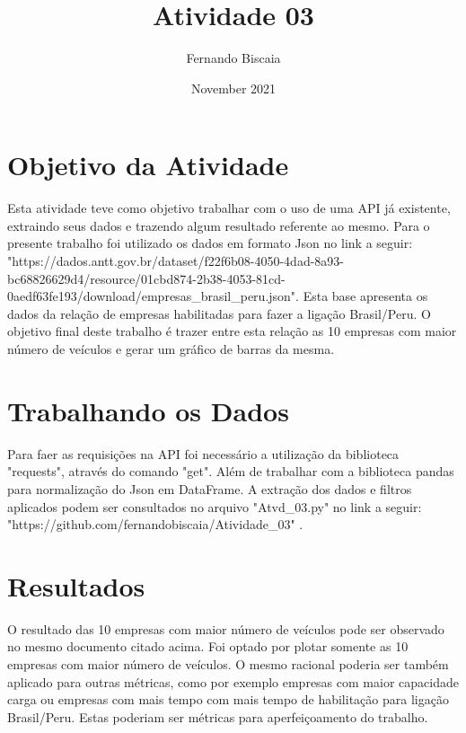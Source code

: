 \documentclass{article}
\title{Atividade 03}
\author{Fernando Biscaia }
\date{November 2021}
\begin{document}
\maketitle

\section{Objetivo da Atividade}

Esta atividade teve como objetivo trabalhar com o uso de uma API já existente, extraindo seus dados e trazendo algum resultado referente ao mesmo.
Para o presente trabalho foi utilizado os dados em formato Json no link a seguir: "https://dados.antt.gov.br/dataset/f22f6b08-4050-4dad-8a93-bc68826629d4/resource/01cbd874-2b38-4053-81cd-0aedf63fe193/download/empresas_brasil_peru.json".
Esta base apresenta os dados da relação de empresas habilitadas para fazer a ligação Brasil/Peru. O objetivo final deste trabalho é trazer entre esta relação as 10 empresas com maior número de veículos e gerar um gráfico de barras da mesma.

\section{Trabalhando os Dados}

Para faer as requisições na API foi necessário a utilização da biblioteca "requests", através do comando "get". Além de trabalhar com a biblioteca pandas para normalização do Json em DataFrame.
A extração dos dados e filtros aplicados podem ser consultados no arquivo "Atvd_03.py" no link a seguir: "https://github.com/fernandobiscaia/Atividade_03" .

\section{Resultados}

O resultado das 10 empresas com maior número de veículos pode ser observado no mesmo documento citado acima.
Foi optado por plotar somente as 10 empresas com maior número de veículos. O mesmo racional poderia ser também aplicado para outras métricas, como por exemplo empresas com maior capacidade carga ou empresas com mais tempo com mais tempo de habilitação para ligação Brasil/Peru.
Estas poderiam ser métricas para aperfeiçoamento do trabalho.
\end{document}
